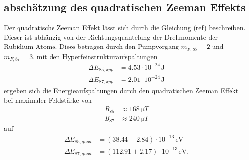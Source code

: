 \subsection{abschätzung des quadratischen Zeeman Effekts}
Der quadratische Zeeman Effekt lässt sich durch die Gleichung (ref) beschreiben. Dieser ist abhängig von der Richtungsquantelung der Drehmomente der Rubidium Atome. Diese betragen durch den Pumpvorgang $m_{F,85} = 2$ und $m_{F, 87} = 3$. mit den Hyperfeinstrukturaufspaltungen 
\begin{align*}
  \Delta E_{85,hyp} &= 4.53 \cdot 10^{-24} \, \text{J} \\
  \Delta E_{87,hyp} &= 2.01 \cdot 10^{-24} \, \text{J}
\end{align*}
ergeben sich die Energieaufspaltungen durch den quadratischen Zeeman Effekt bei maximaler Feldstärke von 
\begin{align*}
  B_{85} &\approx  \SI{168}{\micro T} \\
  B_{87} &\approx  \SI{240}{\micro T}
\end{align*}
auf
\begin{align*}
  \Delta E_{85,quad} &= \left( 38.44 \pm 2.84 \right) \cdot 10^{-13} \, \mathrm{eV} \\
  \Delta E_{87,quad} &= \left( 112.91 \pm 2.17 \right) \cdot 10^{-13} \, \mathrm{eV}  .
\end{align*}

